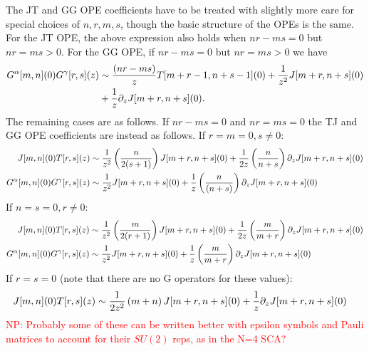 \documentclass[11pt]{amsart}
\theoremstyle{thm}
\numberwithin{equation}{subsection}
\theoremstyle{def}
\theoremstyle{rem}
\begin{document}
The JT and GG OPE coefficients have to be treated with slightly more care for special choices of $n, r, m, s$, though the basic structure of the OPEs is the same.
For the JT OPE, the above expression also holds when $nr - ms = 0$ but $nr = m s >0$. 
For the GG OPE, if $n r - ms = 0$ but $nr = ms > 0$ we have
\begin{align}
G^{\alpha}[m, n](0)G^{\gamma}[r, s](z) &\sim {(nr-ms) \over z}T[m + r -1, n + s -1](0) + {1 \over z^2}J[m + r, n + s](0) \\ \nonumber
&+{1 \over z}\partial_z J[m + r, n+s](0).
\end{align}
The remaining cases are as follows. If $nr-ms = 0$ and $n r = ms = 0$ the TJ and GG OPE coefficients are instead as follows. \newline
If $r = m = 0, s \neq 0$:
\begin{align}
J[m, n](0)T[r, s](z) &\sim {1 \over z^2}\left({n \over 2(s + 1)}\right)J[m + r, n + s](0) +{1 \over 2 z}\left({n \over n + s} \right)\partial_z J[m + r, n + s](0) \\ \nonumber
G^{\alpha}[m, n](0)G^{\gamma}[r, s](z) &\sim {1 \over z^2}J[m + r, n + s](0) +{1 \over z}\left({n \over  (n + s)}\right)\partial_z J[m + r, n+s](0)
\end{align}
If $n = s = 0, r \neq 0$:
\begin{align}
J[m, n](0)T[r, s](z) &\sim {1 \over z^2}\left({m \over 2(r + 1)}\right)J[m + r, n + s](0) +{1 \over 2 z}\left({m \over m + r} \right)\partial_z J[m + r, n + s](0)\\
G^{\alpha}[m, n](0)G^{\gamma}[r, s](z) &\sim {1 \over z^2}J[m + r, n + s](0) +{1 \over z}\left({m \over m + r}\right)\partial_z J[m + r, n+s](0)
\end{align}
If $r = s= 0$ (note that there are no G operators for these values):
\begin{align}
J[m, n](0)T[r, s](z) &\sim {1 \over 2 z^2}\left(m + n\right)J[m + r, n + s](0) +{1 \over  z}\partial_z J[m + r, n + s](0)
\end{align}
\textcolor{red}{NP: Probably some of these can be written better with epsilon symbols and Pauli matrices to account for their $SU(2)$ reps, as in the N=4 SCA?}
\end{document}
